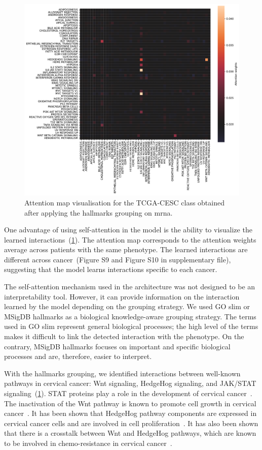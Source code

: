 \documentclass[../main.tex]{subfiles}
\begin{document}
\begin{figure}[htbp]
	\centering
	\includegraphics[width=\linewidth]{Beaude.168.fig.4.pdf}
	\caption{Attention map visualisation for the TCGA-CESC class obtained after applying the hallmarks grouping on \gls{mrna}.}\label{fig:att_map_viz}
\end{figure}

One advantage of using self-attention in the model is the ability to visualize the learned interactions~(\cref{fig:att_map_viz}).
The attention map corresponds to the attention weights average across patients with the same phenotype.
The learned interactions are different across cancer~(Figure S9 and Figure S10 in supplementary file), suggesting that the model learns interactions specific to each cancer.

The self-attention mechanism used in the architecture was not designed to be an interpretability tool.
However, it can provide information on the interaction learned by the model depending on the grouping strategy.
We used GO slim or MSigDB hallmarks as a biological knowledge-aware grouping strategy.
The terms used in GO slim represent general biological processes; the high level of the terms makes it difficult to link the detected interaction with the phenotype.
On the contrary, MSigDB hallmarks focuses on important and specific biological processes and  are, therefore, easier to interpret.


With the hallmarks grouping, we identified interactions between well-known pathways in cervical cancer: Wnt signaling, HedgeHog signaling, and JAK/STAT signaling~(\cref{fig:att_map_viz}).
STAT proteins play a role in the development of cervical cancer~\cite{gutierrez-hoyaRoleJAKSTAT2020}.
The inactivation of the Wnt pathway is known to promote cell growth in cervical cancer~\cite{yangWntSignalingCervical2018}.
It has been shown that HedgeHog pathway components are expressed in cervical cancer cells and are involved in cell proliferation~\cite{samarzijaHedgehogPathwayRegulators2012}.
It has also been shown that there is a crosstalk between Wnt and HedgeHog pathways, which are known to be involved in chemo-resistance in cervical cancer~\cite{kumarRoleNotchHedgehog2021}.
\end{document}

